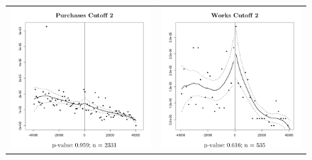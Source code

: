 \documentclass[11pt]{article}
\begin{document}
\begin{figure}[!htbp]
\begin{tabular}{cc}
  \includegraphics[scale=.24]{purchasesmanipulation2} & \includegraphics[scale=.24]{worksmanipulation2} \\

\end{tabular}
\end{figure}
\end{document}
